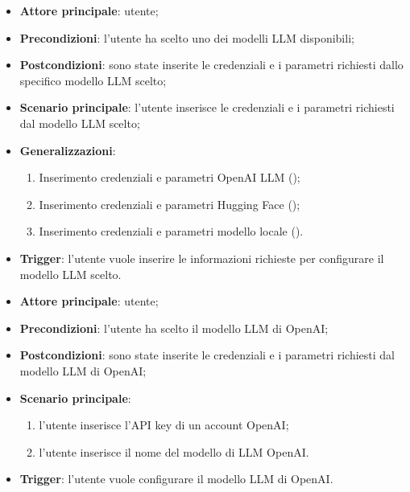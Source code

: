 \documentclass[10pt, a4paper]{article}
\begin{document}
    \begin{itemize}
        \item \textbf{Attore principale}: utente;
        \item \textbf{Precondizioni}: l’utente ha scelto uno dei modelli LLM disponibili;
        \item \textbf{Postcondizioni}: sono state inserite le credenziali e i parametri richiesti dallo specifico modello LLM scelto;
        \item \textbf{Scenario principale}: l’utente inserisce le credenziali e i parametri richiesti dal modello LLM scelto;
        \item \textbf{Generalizzazioni}:
            \begin{enumerate}
                \item Inserimento credenziali e parametri OpenAI LLM ();
                \item Inserimento credenziali e parametri Hugging Face ();
                \item Inserimento credenziali e parametri modello locale ().
            \end{enumerate}
        \item \textbf{Trigger}: l’utente vuole inserire le informazioni richieste per configurare il modello LLM scelto.
    \end{itemize}

    \begin{itemize}
        \item \textbf{Attore principale}: utente;
        \item \textbf{Precondizioni}: l’utente ha scelto il modello LLM di OpenAI;
        \item \textbf{Postcondizioni}: sono state inserite le credenziali e i parametri richiesti dal modello LLM di OpenAI;
        \item \textbf{Scenario principale}:
            \begin{enumerate}
                \item l’utente inserisce l’API key di un account OpenAI;
                \item l’utente inserisce il nome del modello di LLM OpenAI.
            \end{enumerate}
        \item \textbf{Trigger}: l’utente vuole configurare il modello LLM di OpenAI.
    \end{itemize}
\end{document}
